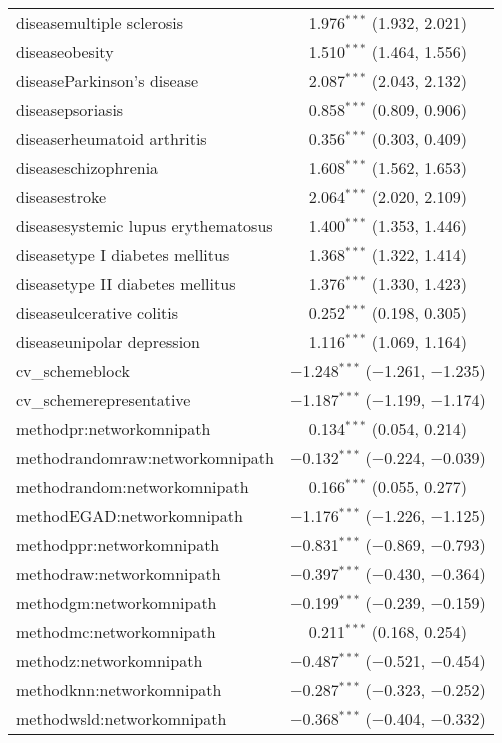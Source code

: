\begin{table}[!htbp]
\begin{tabular}{@{\extracolsep{5pt}}lc}
  diseasemultiple sclerosis & 1.976$^{***}$ (1.932, 2.021) \\ 
  diseaseobesity & 1.510$^{***}$ (1.464, 1.556) \\ 
  diseaseParkinson's disease & 2.087$^{***}$ (2.043, 2.132) \\ 
  diseasepsoriasis & 0.858$^{***}$ (0.809, 0.906) \\ 
  diseaserheumatoid arthritis & 0.356$^{***}$ (0.303, 0.409) \\ 
  diseaseschizophrenia & 1.608$^{***}$ (1.562, 1.653) \\ 
  diseasestroke & 2.064$^{***}$ (2.020, 2.109) \\ 
  diseasesystemic lupus erythematosus & 1.400$^{***}$ (1.353, 1.446) \\ 
  diseasetype I diabetes mellitus & 1.368$^{***}$ (1.322, 1.414) \\ 
  diseasetype II diabetes mellitus & 1.376$^{***}$ (1.330, 1.423) \\ 
  diseaseulcerative colitis & 0.252$^{***}$ (0.198, 0.305) \\ 
  diseaseunipolar depression & 1.116$^{***}$ (1.069, 1.164) \\ 
  cv\_schemeblock & $-$1.248$^{***}$ ($-$1.261, $-$1.235) \\ 
  cv\_schemerepresentative & $-$1.187$^{***}$ ($-$1.199, $-$1.174) \\ 
  methodpr:networkomnipath & 0.134$^{***}$ (0.054, 0.214) \\ 
  methodrandomraw:networkomnipath & $-$0.132$^{***}$ ($-$0.224, $-$0.039) \\ 
  methodrandom:networkomnipath & 0.166$^{***}$ (0.055, 0.277) \\ 
  methodEGAD:networkomnipath & $-$1.176$^{***}$ ($-$1.226, $-$1.125) \\ 
  methodppr:networkomnipath & $-$0.831$^{***}$ ($-$0.869, $-$0.793) \\ 
  methodraw:networkomnipath & $-$0.397$^{***}$ ($-$0.430, $-$0.364) \\ 
  methodgm:networkomnipath & $-$0.199$^{***}$ ($-$0.239, $-$0.159) \\ 
  methodmc:networkomnipath & 0.211$^{***}$ (0.168, 0.254) \\ 
  methodz:networkomnipath & $-$0.487$^{***}$ ($-$0.521, $-$0.454) \\ 
  methodknn:networkomnipath & $-$0.287$^{***}$ ($-$0.323, $-$0.252) \\ 
  methodwsld:networkomnipath & $-$0.368$^{***}$ ($-$0.404, $-$0.332) \\ 

\end{tabular}
\end{table}
